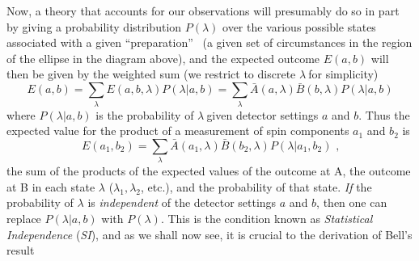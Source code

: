 \documentclass[12pt]{article}%
\begin{document}
Now, a theory that accounts for our observations will presumably do so in part
by giving a probability distribution $P(\lambda)$ over the various possible
states associated with a given \textquotedblleft preparation\textquotedblright%
\ (a given set of circumstances in the region of the ellipse in the diagram
above), and the expected outcome $E(a,b)$ will then be given by the weighted
sum (we restrict to discrete $\lambda~$for simplicity)
\begin{equation}
E(a,b)=%
{\displaystyle\sum\limits_{\lambda}}
E(a,b,\lambda)P(\lambda|a,b)=%
{\displaystyle\sum\limits_{\lambda}}
\bar{A}(a,\lambda)\bar{B}(b,\lambda)P(\lambda|a,b) \label{exp2}%
\end{equation}
where $P(\lambda|a,b)$ is the probability of $\lambda~$given detector settings
$a$ and $b$. Thus the expected value for the product of a measurement of spin
components $a_{1}$ and $b_{2}$ is
\begin{equation}
E(a_{1},b_{2})=%
{\displaystyle\sum\limits_{\lambda}}
\bar{A}(a_{1},\lambda)\bar{B}(b_{2},\lambda)P(\lambda|a_{1},b_{2})\text{ ,}
\label{exp3}%
\end{equation}
the sum of the products of the expected values of the outcome at A, the
outcome at B in each state $\lambda$ ($\lambda_{1},\lambda_{2}$, etc.), and
the probability of that state. \emph{If} the probability of $\lambda$ is
\emph{independent} of the detector settings $a$ and $b$, then one can replace
$P(\lambda|a,b)$ with $P(\lambda)$. This is the condition known as
\emph{Statistical Independence} (\emph{SI}), and as we shall now see, it is
crucial to the derivation of Bell's result
\end{document}
